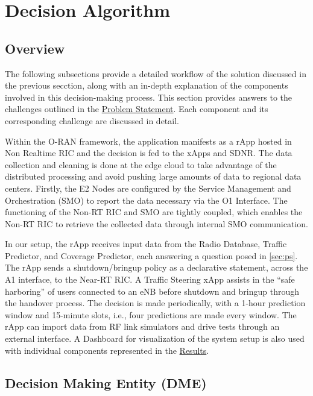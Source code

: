 \section{Decision Algorithm}
\label{sec:algorithm}

\subsection{Overview}

The following subsections provide a detailed workflow of the solution discussed in the previous secction, along with an in-depth explanation of the components involved in this decision-making process.
This section provides answers to the challenges outlined in the \hyperref[sec:ps]{Problem Statement}. Each component and its corresponding challenge are discussed in detail.

Within the O-RAN framework, the application manifests as a rApp hosted in Non Realtime RIC and the decision is fed to the xApps and SDNR. 
The data collection and cleaning is done at the edge cloud to take advantage of the distributed processing and avoid pushing large amounts of data to regional data centers.
Firstly, the E2 Nodes are configured by the Service Management and Orchestration (SMO) to report the data necessary via the O1 Interface. 
The functioning of the Non-RT RIC and SMO are tightly coupled, which enables the Non-RT RIC to retrieve the collected data through internal SMO communication. 

In our setup, the rApp receives input data from the Radio Database, Traffic Predictor, and Coverage Predictor, each answering a question posed in \ref{sec:ps}.
The rApp sends a shutdown/bringup policy as a declarative statement, across the A1 interface, to the Near-RT RIC. 
A Traffic Steering xApp assists in the “safe harboring” of users connected to an eNB before shutdown and bringup through the handover process. 
The decision is made periodically, with a 1-hour prediction window and 15-minute slots, i.e., four predictions are made every window. 
The rApp can import data from RF link simulators and drive tests through an external interface. 
A Dashboard for visualization of the system setup is also used with individual components represented in the \hyperref[sec:results]{Results}.

\subsection{Decision Making Entity (DME)}

